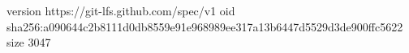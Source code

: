 version https://git-lfs.github.com/spec/v1
oid sha256:a090644c2b8111d0db8559e91e968989ee317a13b6447d5529d3de900ffc5622
size 3047
